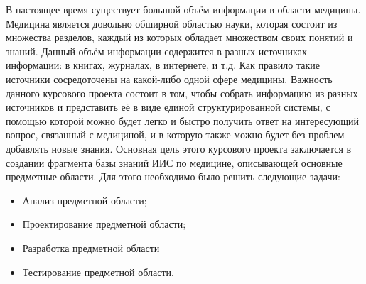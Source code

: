 \label{sec:intro}
В настоящее время существует большой объём информации в области медицины. Медицина является довольно обширной областью науки,
которая состоит из множества разделов, каждый из которых обладает множеством своих понятий и знаний. Данный объём информации содержится в разных источниках информации: в книгах, журналах, в интернете, и т.д. Как правило такие источники сосредоточены на какой-либо одной сфере медицины. Важность данного курсового проекта состоит в том, чтобы собрать информацию из разных источников и представить её в виде единой структурированной системы, с помощью которой можно будет легко и быстро получить ответ на интересующий вопрос, связанный с медициной, и в которую также можно будет без проблем добавлять новые знания. Основная цель этого курсового проекта заключается в создании фрагмента базы знаний ИИС по медицине, описывающей основные предметные области. Для этого необходимо было решить следующие задачи:

\begin{itemize}	
	\item{Анализ предметной области;}
	\item{Проектирование предметной области;}
	\item{Разработка предметной области}
	\item{Тестирование предметной области.}
\end{itemize}

